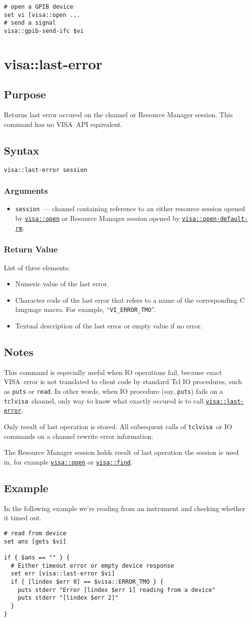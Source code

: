 \documentclass[12pt, a4paper]{report}
\newcommand{\tclvisa}{{\tt tclvisa }}
\newcommand{\VISA}{\mbox{VISA }}
\newcommand{\COMMANDREF}[1]{{\tt \hyperref[#1]{#1}}}
\newcommand{\TCLCOMMANDREF}[1]{{\tt \mbox{#1}}\index{#1}}
\newcommand{\EXAMPLE}{\subsection*{Example}}
\newcommand{\PURPOSE}{\subsection*{Purpose}}
\newcommand{\SYNTAX}[1]{\subsection*{Syntax}{\tt #1}}
\newcommand{\NOTES}{\subsection*{Notes}}
\newcommand{\ARGUMENTS}{\subsubsection*{Arguments}}
\newcommand{\RETURN}{\subsubsection*{Return Value}}
\newcommand{\COMMAND}[1]{\section{#1}\label{#1}}
\newcommand{\BEGINARGUMENTS}{\ARGUMENTS\begin{itemize}}
\newcommand{\ENDARGUMENTS}{\end{itemize}}
\newcommand{\ARGUMENT}[1]{\item {\tt \mbox{#1}}~---}
\begin{document}
\begin{verbatim} 
# open a GPIB device
set vi [visa::open ...
# send a signal
visa::gpib-send-ifc $vi
\end{verbatim} 


\COMMAND{visa::last-error}

\PURPOSE

Returns last error occured on the channel or Resource Manager session. This command has no \VISA API equivalent.

\SYNTAX{visa::last-error session}

\BEGINARGUMENTS
\ARGUMENT{session} channel containing reference to an either resource session opened by \COMMANDREF{visa::open} or Resource Manager session opened by \COMMANDREF{visa::open-default-rm}.
\ENDARGUMENTS

\RETURN

List of three elements:

\begin{itemize}
\item Numeric value of the last error.
\item Character code of the last error that refers to a name of the corresponding C language macro. For example, ``{\tt VI\_ERROR\_TMO}''.
\item Textual description of the last error or empty value if no error.
\end{itemize}

\NOTES

This command is especially useful when IO operations fail, because exact \VISA error is not translated to client code by standard Tcl IO procedures, such as \TCLCOMMANDREF{puts} or \TCLCOMMANDREF{read}. In other words, when IO procedure (say, \TCLCOMMANDREF{puts}) fails on a \tclvisa channel, only way to know what exactly occured is to call \COMMANDREF{visa::last-error}.

Only result of last operation is stored. All subsequent calls of \tclvisa or IO commands on a channel rewrite error information.

The Resource Manager session holds result of last operation the session is used in, for example \COMMANDREF{visa::open} or \COMMANDREF{visa::find}.

\EXAMPLE

In the following example we're reading from an instrument and checking whether it timed out.

\begin{verbatim} 
# read from device
set ans [gets $vi]

if { $ans == "" } {
  # Either timeout error or empty device response
  set err [visa::last-error $vi]
  if { [lindex $err 0] == $visa::ERROR_TMO } {
    puts stderr "Error [lindex $err 1] reading from a device"
    puts stderr "[lindex $err 2]"
  }
}
\end{verbatim} 
\end{document}
